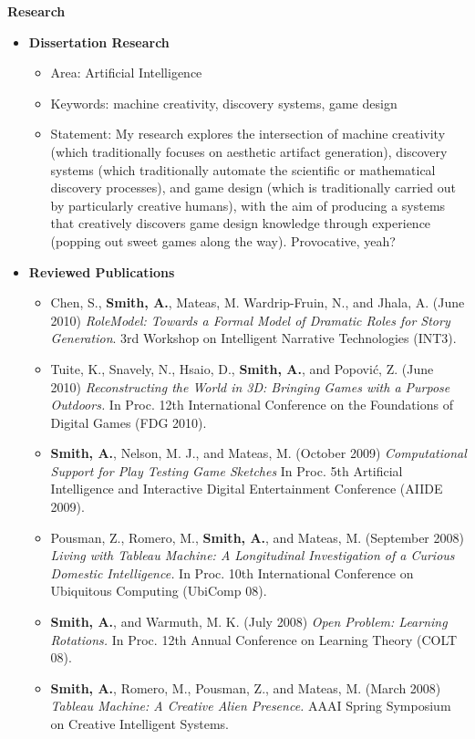 \documentclass[10pt]{article}
\begin{document}
{\large \textbf{Research}}
\begin{itemize}

\item
    \textbf{Dissertation Research}
    \begin{itemize}
        \item Area: Artificial Intelligence
        \item Keywords: machine creativity, discovery systems, game design
        \item Statement: My research explores the intersection of machine creativity (which traditionally focuses on aesthetic artifact generation), discovery systems (which traditionally automate the scientific or mathematical discovery processes), and game design (which is traditionally carried out by particularly creative humans), with the aim of producing a systems that creatively discovers game design knowledge through experience (popping out sweet games along the way). Provocative, yeah?
    \end{itemize}
 
\item 
    \textbf{Reviewed Publications}
    \begin{itemize}
        \item Chen, S., {\bf Smith, A.}, Mateas, M. Wardrip-Fruin, N., and Jhala, A.  (June 2010) \emph{RoleModel: Towards a Formal Model of Dramatic Roles for Story Generation}. 3rd Workshop on Intelligent Narrative Technologies (INT3).
        \item Tuite, K., Snavely, N., Hsaio, D., {\bf Smith, A.}, and Popovi\'{c}, Z. (June 2010) \emph{Reconstructing the World in 3D: Bringing Games with a Purpose Outdoors.} In Proc. 12th International Conference on the Foundations of Digital Games (FDG 2010).
        \item {\bf Smith, A.}, Nelson, M. J., and Mateas, M. (October 2009) \emph{Computational Support for Play Testing Game Sketches} In Proc. 5th Artificial Intelligence and Interactive Digital Entertainment Conference (AIIDE 2009).
        \item Pousman, Z., Romero, M., {\bf Smith, A.}, and Mateas, M. (September 2008) \emph{Living with Tableau Machine: A Longitudinal Investigation of a Curious Domestic Intelligence.} In Proc. 10th International Conference on Ubiquitous Computing (UbiComp 08).
        \item {\bf Smith, A.}, and Warmuth, M. K. (July 2008) \emph{Open Problem: Learning Rotations.} In Proc. 12th Annual Conference on Learning Theory (COLT 08).
        \item {\bf Smith, A.}, Romero, M., Pousman, Z., and Mateas, M. (March 2008) \emph{Tableau Machine: A Creative Alien Presence.} AAAI Spring Symposium on Creative Intelligent Systems. 
  \end{itemize}
  

\end{itemize}
\end{document}
